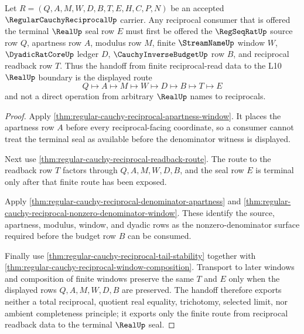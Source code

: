 \begin{theorem}
\label{thm:regular-cauchy-reciprocal-real-seal-handoff}
Let $R=(Q,A,M,W,D,B,T,E,H,C,P,N)$ be an accepted $\RegularCauchyReciprocalUp$ carrier. Any reciprocal consumer that is offered the terminal $\RealUp$ seal row $E$ must first be offered the $\RegSeqRatUp$ source row $Q$, apartness row $A$, modulus row $M$, finite $\StreamNameUp$ window $W$, $\DyadicRatCoreUp$ ledger $D$, $\CauchyInverseBudgetUp$ row $B$, and reciprocal readback row $T$. Thus the handoff from finite reciprocal-read data to the L10 $\RealUp$ boundary is the displayed route
$$
Q\longmapsto A\longmapsto M\longmapsto W\longmapsto D\longmapsto B\longmapsto T\longmapsto E
$$
and not a direct operation from arbitrary $\RealUp$ names to reciprocals.
\end{theorem}
\begin{proof}
Apply \autoref{thm:regular-cauchy-reciprocal-apartness-window}. It places the apartness row $A$ before every reciprocal-facing coordinate, so a consumer cannot treat the terminal seal as available before the denominator witness is displayed.

Next use \autoref{thm:regular-cauchy-reciprocal-readback-route}. The route to the readback row $T$ factors through $Q,A,M,W,D,B$, and the seal row $E$ is terminal only after that finite route has been exposed.

Apply \autoref{thm:regular-cauchy-reciprocal-denominator-apartness} and \autoref{thm:regular-cauchy-reciprocal-nonzero-denominator-window}. These identify the source, apartness, modulus, window, and dyadic rows as the nonzero-denominator surface required before the budget row $B$ can be consumed.

Finally use \autoref{thm:regular-cauchy-reciprocal-tail-stability} together with \autoref{thm:regular-cauchy-reciprocal-window-composition}. Transport to later windows and composition of finite windows preserve the same $T$ and $E$ only when the displayed rows $Q,A,M,W,D,B$ are preserved. The handoff therefore exports neither a total reciprocal, quotient real equality, trichotomy, selected limit, nor ambient completeness principle; it exports only the finite route from reciprocal readback data to the terminal $\RealUp$ seal.
\end{proof}

